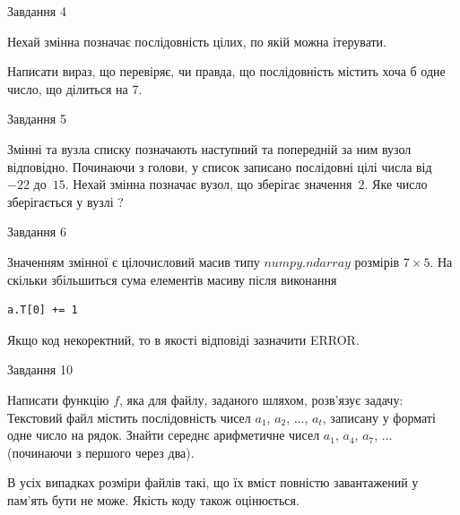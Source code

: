 \documentclass[12pt, ukrainian]{article}
\begin{document}
{\begin{minipage}[t]{8.0cm}
\end{minipage}

               
{\begin{center}Завдання {4}\end{center}}
\vspace{-6mm}
Нехай змінна  позначає послідовність цілих, по якій можна ітерувати.

Написати вираз, що перевіряє, чи правда, що послідовність  містить хоча б одне число, що ділиться на 7.\par

\vspace{10mm}
               
{\begin{center}Завдання {5}\end{center}}
\vspace{-6mm}
Змінні  та  вузла списку позначають наступний та попередній за ним вузол відповідно. Починаючи з голови, у список записано послідовні цілі числа від~$-22$ до~$15$. Нехай змінна  позначає вузол, що зберігає значення~$2$.
Яке число зберігається у вузлі  ?\par

               
{\begin{center}Завдання {6}\end{center}}
\vspace{-6mm}
Значенням змінної  є цілочисловий масив типу $numpy.ndarray$ розмірів $7{\times}5$. На скільки збільшиться сума елементів масиву  після виконання
\begin{verbatim}
a.T[0] += 1
\end{verbatim}


Якщо код некоректний, то в якості відповіді зазначити ERROR.\par

               
{\begin{center}Завдання {10}\end{center}}
\vspace{-6mm}

Написати функцію $f$, яка для файлу, заданого шляхом, розв’язує задачу:\\ Текстовий файл містить послідовність чисел $a_1$, $a_2$, $\ldots$, $a_t$, записану у форматі одне число на рядок. Знайти середнє арифметичне чисел $a_1$, $a_4$, $a_7$, $\ldots$ (починаючи з першого через два).

В усіх випадках розміри файлів такі, що їх вміст повністю завантажений у пам'ять бути не може. Якість коду також оцінюється.



}
\end{document}
